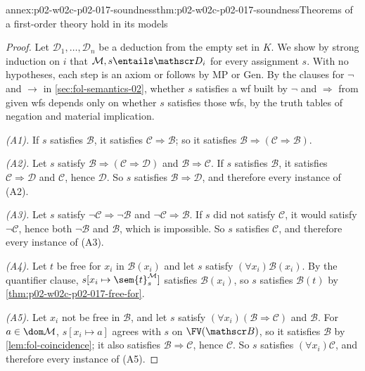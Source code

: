 \begin{annexitem}{annex:p02-w02c-p02-017-soundness}{thm:p02-w02c-p02-017-soundness}{Theorems of a first-order theory hold in its models}
\begin{proof}
Let \(\mathscr D_1,\ldots,\mathscr D_n\) be a deduction from the empty set in
\(K\).  We show by strong induction on \(i\) that \(\mathcal M,s\entails
\mathscr D_i\) for every assignment \(s\).  With no hypotheses, each step is
an axiom or follows by MP or Gen.  By the clauses for \(\neg\) and \(\to\) in
\cref{sec:fol-semantics-02}, whether \(s\) satisfies a wf built by
\(\neg\) and \(\Rightarrow\) from given wfs depends only on whether \(s\)
satisfies those wfs, by the truth tables of negation and material
implication.

\emph{(A1).}  If \(s\) satisfies \(\mathscr B\), it satisfies
\(\mathscr C\Rightarrow\mathscr B\); so it satisfies
\(\mathscr B\Rightarrow(\mathscr C\Rightarrow\mathscr B)\).

\emph{(A2).}  Let \(s\) satisfy
\(\mathscr B\Rightarrow(\mathscr C\Rightarrow\mathscr D)\) and
\(\mathscr B\Rightarrow\mathscr C\).  If \(s\) satisfies \(\mathscr B\), it
satisfies \(\mathscr C\Rightarrow\mathscr D\) and \(\mathscr C\), hence
\(\mathscr D\).  So \(s\) satisfies \(\mathscr B\Rightarrow\mathscr D\), and
therefore every instance of (A2).

\emph{(A3).}  Let \(s\) satisfy \(\neg\mathscr C\Rightarrow\neg\mathscr B\)
and \(\neg\mathscr C\Rightarrow\mathscr B\).  If \(s\) did not satisfy
\(\mathscr C\), it would satisfy \(\neg\mathscr C\), hence both
\(\neg\mathscr B\) and \(\mathscr B\), which is impossible.  So \(s\)
satisfies \(\mathscr C\), and therefore every instance of (A3).

\emph{(A4).}  Let \(t\) be free for \(x_i\) in \(\mathscr B(x_i)\) and let
\(s\) satisfy \((\forall x_i)\mathscr B(x_i)\).  By the quantifier clause,
\(s[x_i\mapsto\sem{t}^{\mathcal M}_{s}]\) satisfies
\(\mathscr B(x_i)\), so \(s\) satisfies \(\mathscr B(t)\) by
\cref{thm:p02-w02c-p02-017-free-for}.

\emph{(A5).}  Let \(x_i\) not be free in \(\mathscr B\), and let \(s\) satisfy
\((\forall x_i)(\mathscr B\Rightarrow\mathscr C)\) and \(\mathscr B\).  For
\(a\in\dom\mathcal M\), \(s[x_i\mapsto a]\) agrees with \(s\) on
\(\FV(\mathscr B)\), so it satisfies \(\mathscr B\) by
\cref{lem:fol-coincidence}; it also satisfies
\(\mathscr B\Rightarrow\mathscr C\), hence \(\mathscr C\).  So \(s\)
satisfies \((\forall x_i)\mathscr C\), and therefore every instance of (A5).


\end{proof}
\end{annexitem}
